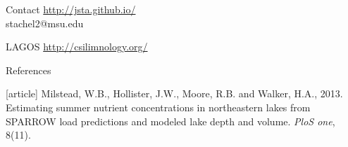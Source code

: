 \documentclass[bigger]{beamer}
\begin{document}
\begin{frame}
\vspace{2em}
\begin{block}{Contact}
   \href{http://jsta.github.io/}{http://jsta.github.io/}\\
   stachel2@msu.edu
\end{block}

\vspace{1em}

\begin{block}{LAGOS}
  \href{http://csilimnology.org/}{http://csilimnology.org/}
\end{block}

\vspace{1em}

\begin{block}{References}
\begin{thebibliography}{2}
[article]
 Milstead, W.B., Hollister, J.W., Moore, R.B. and Walker, H.A., 2013. Estimating summer nutrient concentrations in northeastern lakes from SPARROW load predictions and modeled lake depth and volume. \emph{PloS one}, 8(11).
\end{thebibliography}
\end{block}

\end{frame}
\end{document}
